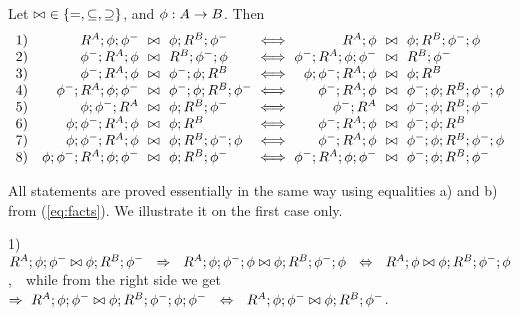 \documentclass[10pt]{article}
\begin{document}
\begin{Fact}
\label{fa:facts}
Let $\bowtie\ \in\{=,\subseteq,\supseteq\}$, and $\phi:A\rightarrow B$. Then
\[
\begin{array}{r@{)\ \ \ }r@{\ \ \any\ \ }l@{\ \iff\ }r@{\ \ \any\ \ }l}
1 & R^A;\phi;\phi^- & \phi;R^B;\phi^- & R^A;\phi & \phi;R^B;\phi^-;\phi \\
2 & \phi^-;R^A;\phi & R^B;\phi^-;\phi &\phi^-;R^A;\phi;\phi^- & R^B;\phi^- \\
3 & \phi^-;R^A;\phi & \phi^-;\phi;R^B  & \phi;\phi^-;R^A;\phi &\phi;R^B \\
4 & \phi^-;R^A;\phi;\phi^-  & \phi^-;\phi;R^B;\phi^- &
        \phi^-;R^A;\phi & \phi^-;\phi;R^B;\phi^-;\phi \\
5 & \phi;\phi^-;R^A & \phi;R^B;\phi^- & 
        \phi^-;R^A & \phi^-;\phi;R^B;\phi^- \\
6 &\phi;\phi^-;R^A;\phi & \phi;R^B & 
        \phi^-;R^A;\phi & \phi^-;\phi;R^B \\
7 &\phi;\phi^-;R^A;\phi & \phi;R^B;\phi^-;\phi & 
        \phi^-;R^A;\phi & \phi^-;\phi;R^B;\phi^-;\phi \\
8 &\phi;\phi^-;R^A;\phi;\phi^- & \phi;R^B;\phi^- &
        \phi^-;R^A;\phi;\phi^- & \phi^-;\phi;R^B;\phi^-
\end{array}
\]
\end{Fact}
%
\begin{Proof} 
All statements are proved essentially in the same way using equalities
a) and b) from (\ref{eq:facts}). We illustrate it on the first case
only.

1) \ $R^A;\phi;\phi^-\any \phi;R^B;\phi^- \ \ 
   \impl \ \ R^A;\phi;\phi^-;\phi \any \phi;R^B;\phi^-;\phi \ \ 
   \Iff \ \ R^A;\phi \any \phi;R^B;\phi^-;\phi$,\ \ 
   while from the right side we get \ 
   $\impl \ R^A;\phi;\phi^- \any \phi;R^B;\phi^-;\phi;\phi^- \ \ 
   \Iff \ \ R^A;\phi;\phi^-\any \phi;R^B;\phi^-$.
\end{Proof}
\end{document}
